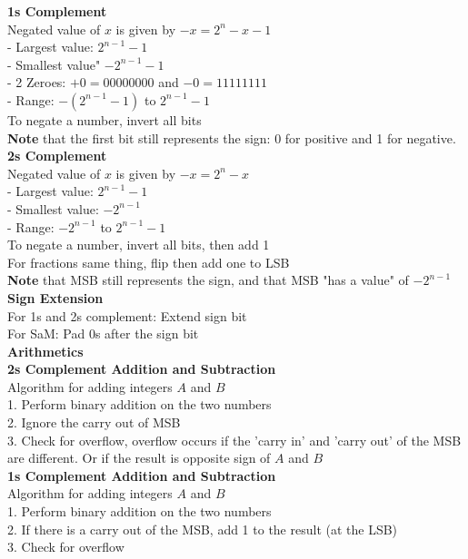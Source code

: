 \documentclass[10pt, a4paper]{article}
\newcommand{\highlight}[1]{{\color{red}\textbf{#1}}}
\begin{document}
\begin{multicols*}{3}
		\textbf{1s Complement}\\
		Negated value of $x$ is given by $-x = 2^n - x - 1$\\
		- Largest value: $2^{n - 1} - 1$\\
		- Smallest value" $- 2^{n - 1} - 1$\\
		- 2 Zeroes: $+0 = 00000000$ and $-0 = 11111111$\\
		- Range: $-(2^{n - 1} - 1)$ to $2^{n - 1} - 1$\\
		To negate a number, invert all bits\\
		\highlight{Note} that the first bit still represents the sign: 0 for positive and 1 for negative.\\
		
		\textbf{2s Complement}\\
		Negated value of $x$ is given by $-x = 2^n - x$\\
		- Largest value: $2^{n - 1} - 1$\\
		- Smallest value: $-2^{n - 1}$\\
		- Range: $-2^{n - 1}$ to $2^{n - 1} - 1$\\
		To negate a number, invert all bits, then add 1\\
		For fractions same thing, flip then add one to LSB\\
		\highlight{Note} that MSB still represents the sign, and that MSB "has a value" of $-2^{n - 1}$\\
		
		\textbf{Sign Extension}\\
		For 1s and 2s complement: Extend sign bit\\
		For SaM: Pad 0s after the sign bit\\
		
		\textbf{Arithmetics}\\
		\textbf{2s Complement Addition and Subtraction}\\
		Algorithm for adding integers $A$ and $B$\\
		1. Perform binary addition on the two numbers\\
		2. Ignore the carry out of MSB\\
		3. Check for overflow, overflow occurs if the 'carry in' and 'carry out' of the MSB are different. Or if the result is opposite sign of $A$ and $B$\\
		
		\textbf{1s Complement Addition and Subtraction}\\
		Algorithm for adding integers $A$ and $B$\\
		1. Perform binary addition on the two numbers\\
		2. If there is a carry out of the MSB, add 1 to the result (at the LSB)\\
		3. Check for overflow\\
		

\end{multicols*}
\end{document}
